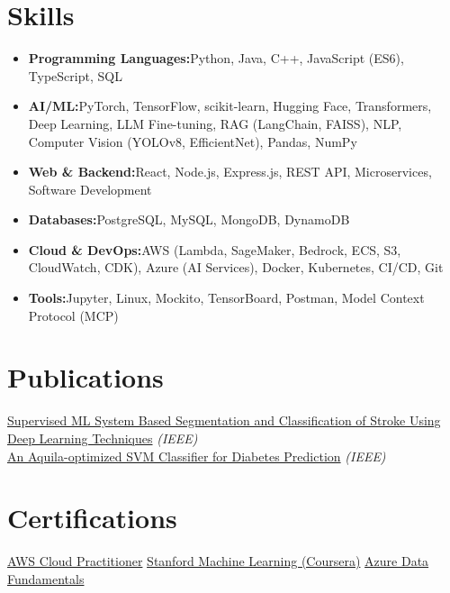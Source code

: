 \documentclass[a4paper,10pt]{article}
\newcommand{\resumeItem}[2]{\item{\textbf{#1}{\hspace{0.5mm}#2 \vspace{-0.5mm}}}}
\newcommand{\resumeSubItem}[2]{\resumeItem{#1}{#2}\vspace{-3pt}}
\newcommand{\resumeHeadingSkillStart}{\begin{itemize}[leftmargin=*, itemsep=0.6mm, rightmargin=2ex]}
\newcommand{\resumeHeadingSkillEnd}{\end{itemize}\vspace{-2mm}}
\begin{document}
\section{\textbf{Skills}}
\resumeHeadingSkillStart
\resumeSubItem{Programming Languages:}{Python, Java, C++, JavaScript (ES6), TypeScript, SQL}
\resumeSubItem{AI/ML:}{PyTorch, TensorFlow, scikit-learn, Hugging Face, Transformers, Deep Learning, LLM Fine-tuning, RAG (LangChain, FAISS), NLP, Computer Vision (YOLOv8, EfficientNet), Pandas, NumPy}
\resumeSubItem{Web \& Backend:}{React, Node.js, Express.js, REST API, Microservices, Software Development}
\resumeSubItem{Databases:}{PostgreSQL, MySQL, MongoDB, DynamoDB}
\resumeSubItem{Cloud \& DevOps:}{AWS (Lambda, SageMaker, Bedrock, ECS, S3, CloudWatch, CDK), Azure (AI Services), Docker, Kubernetes, CI/CD, Git}
\resumeSubItem{Tools:}{Jupyter, Linux, Mockito, TensorBoard, Postman, Model Context Protocol (MCP)}
\resumeHeadingSkillEnd
\vspace{0mm}

\section{\textbf{Publications}}
\footnotesize{
\href{https://ieeexplore.ieee.org/document/9792818}{Supervised ML System Based Segmentation and Classification of Stroke Using Deep Learning Techniques} \textit{(IEEE)} \\
\href{https://ieeexplore.ieee.org/document/10060334}{An Aquila-optimized SVM Classifier for Diabetes Prediction} \textit{(IEEE)}
}
\vspace{-3mm}

\section{\textbf{Certifications}}
\footnotesize{
\href{https://drive.google.com/file/d/1a3exoiS79RS3q8vSJHT-PpkczSPg54EZ/view}{AWS Cloud Practitioner} \hfill \href{https://drive.google.com/file/d/1At3BLkqJ9vuhPPUCcrNAw9yNH5li7XdQ/view}{Stanford Machine Learning (Coursera)} \hfill \href{https://drive.google.com/file/d/1VBJjfRMsIm8BckoUtLUV7ZbY88Jju2qT/view}{Azure Data Fundamentals}
}
\end{document}
